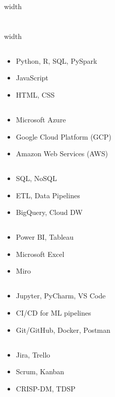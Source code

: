 \medskip

\leaders\vrule width \textwidth\vskip 0.08pt
\section*{\computing}
\leaders\vrule width \textwidth\vskip 0.08pt

\medskip

\noindent

\newcommand{\prolangSection}[3]{%
\begin{minipage}[t]{#1}
\subsection*{\centering{\underline{#2}}}
\smallskip
\begin{itemize}
\setlength{\itemsep}{0.04cm}
\setlength{\parskip}{0.04cm}
#3
\end{itemize}
\end{minipage}
}

\begin{minipage}[t]{\linewidth}
\prolangSection{0.30\linewidth}{\prolangI}{%
\item Python, R, SQL, PySpark
\item JavaScript
\item HTML, CSS
}
\hfill
\prolangSection{0.30\linewidth}{\prolangII}{%
\item Microsoft Azure
\item Google Cloud Platform (GCP)
\item Amazon Web Services (AWS)
}
\hfill
\prolangSection{0.30\linewidth}{\prolangIII}{%
\item SQL, NoSQL
\item ETL, Data Pipelines
\item BigQuery, Cloud DW
}
\end{minipage}

\vspace{0.3cm}
\noindent

\begin{minipage}[t]{\linewidth}
\prolangSection{0.30\linewidth}{\prolangIV}{%
\item Power BI, Tableau
\item Microsoft Excel
\item Miro
}
\hfill
\prolangSection{0.30\linewidth}{\prolangV}{%
\item Jupyter, PyCharm, VS Code
\item CI/CD for ML pipelines
\item Git/GitHub, Docker, Postman
}
\hfill
\prolangSection{0.30\linewidth}{\prolangVI}{%
\item Jira, Trello
\item Scrum, Kanban
\item CRISP-DM, TDSP
}
\end{minipage}

